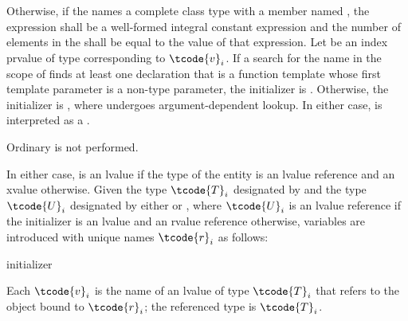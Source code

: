 \pnum
Otherwise, if
the  
names a complete class type with a member named ,
the expression 
shall be a well-formed integral constant expression
and
the number of elements in
the  shall be equal to the value of that
expression.
Let  be an index prvalue of type 
corresponding to $\tcode{v}_i$.
If a search for the name 
in the scope of 
finds at least one declaration
that is a function template whose first template parameter
is a non-type parameter,
the initializer is
. Otherwise, the initializer is ,
where  undergoes argument-dependent lookup.
In either case,  is interpreted as a .
\begin{note}
Ordinary  is not performed.
\end{note}
In either case,  is an lvalue if the type of the entity 
is an lvalue reference and an xvalue otherwise.
Given the type $\tcode{T}_i$ designated by
 and
the type $\tcode{U}_i$ designated by
either  or ,
where $\tcode{U}_i$ is an lvalue reference if
the initializer is an lvalue and an rvalue reference otherwise,
variables are introduced with unique names $\tcode{r}_i$ as follows:
\begin{ncbnf}
  initializer \terminal{;}
\end{ncbnf}

Each $\tcode{v}_i$ is the name of an lvalue of type $\tcode{T}_i$
that refers to the object bound to $\tcode{r}_i$;
the referenced type is $\tcode{T}_i$.

